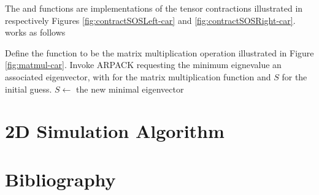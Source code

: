 \documentclass{article}
\begin{document}
The  and  functions are implementations of the tensor contractions illustrated in respectively Figures \ref{fig:contractSOSLeft-car} and \ref{fig:contractSOSRight-car}.   works as follows
\begin{codebox}
\li Define the function  to be the matrix multiplication operation illustrated in Figure \ref{fig:matmul-car}.
\li Invoke ARPACK requesting the minimum eignevalue an associated eigenvector,
\zi with  for the matrix multiplication function and $S$ for the initial guess.
\li $S \gets$ the new minimal eigenvector
\end{codebox}

\part{2D Simulation Algorithm}
\label{2dsim}

\part*{Bibliography}



\end{document}
